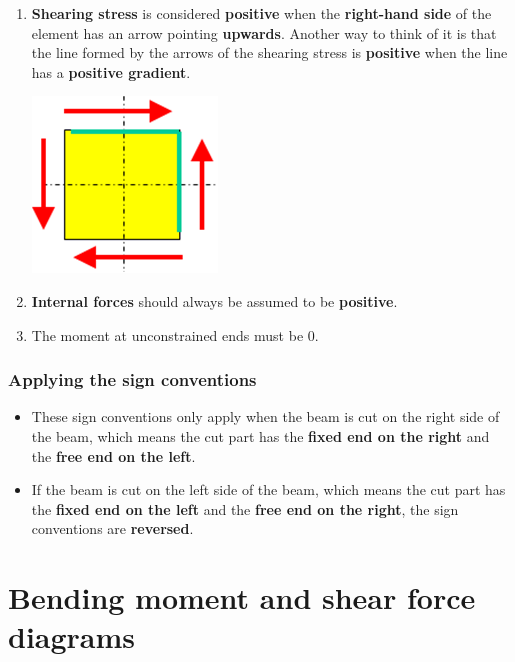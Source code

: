 \documentclass[11pt]{article}
\begin{document}
\begin{enumerate}
\item \textbf{Shearing stress} is considered \textbf{positive} when the \textbf{right-hand side} of the element has an arrow pointing \textbf{upwards}. Another way to think of it is that the line formed by the arrows of the shearing stress is \textbf{positive} when the line has a \textbf{positive gradient}.
\begin{center}
\includegraphics[scale=0.7]{./images/positive-shear-stress.png}
\end{center}

\item \textbf{Internal forces} should always be assumed to be \textbf{positive}.
\item The moment at unconstrained ends must be 0.
\end{enumerate}

\newpage

\subsubsection{Applying the sign conventions}
\label{sec:orgfc5f951}
\begin{itemize}
\item These sign conventions only apply when the beam is cut on the right side of the beam, which means the cut part has the \textbf{fixed end on the right} and the \textbf{free end on the left}.
\item If the beam is cut on the left side of the beam, which means the cut part has the \textbf{fixed end on the left} and the \textbf{free end on the right}, the sign conventions are \textbf{reversed}.
\end{itemize}

\section{Bending moment and shear force diagrams}
\label{sec:orgb224ec0}
\end{document}
